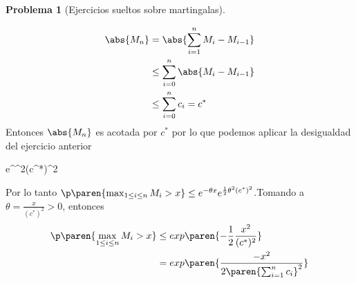 \documentclass[a5paper,oneside]{amsart}
\theoremstyle{plain}
\theoremstyle{definition}
\newtheorem{problema}{Problema}
\begin{document}
\begin{problema}[Ejercicios sueltos sobre martingalas]
\begin{enumerate}
\begin{enumerate}
\begin{align}
                        			\abs{M_n}&=\abs{\sum_{i=1}^{n}M_i-M_{i-1}}\notag \\
                        			&\leq \sum_{i=0}^{n}\abs{M_i-M_{i-1}}\notag \\
                        			&\leq\sum_{i=0}^{n}c_i=c^* \notag
                        			\end{align}
                        			Entonces $\abs{M_n}$ es acotada por $c^*$ por lo que podemos aplicar la desigualdad del ejercicio anterior
                        			\begin{esn}
                        			  \leq e^{\theta^2(c^*)^2}
                        			\end{esn}
                        			Por lo tanto $\p\paren{\max_{1\leq i \leq n}  M_i>  x} \leq  e^{-\theta x} e^{\frac{1}{2}\theta^2(c^*)^2}$.Tomando a $\theta=\frac{x}{(c^*)^2}>0$, entonces
                        			\begin{align}
                        			\p\paren{\max_{1\leq i \leq n}  M_i>  x} &\leq exp\paren{-\frac{1}{2}\frac{x^2}{(c^*)^2}} \notag \\  &=exp\paren{\frac{-x^2}{2\paren{\sum_{i=1}^{n}c_i}^2}}\notag \\
                        			\end{align}
        \end{enumerate}
\end{enumerate}
\end{problema}
\end{document}
